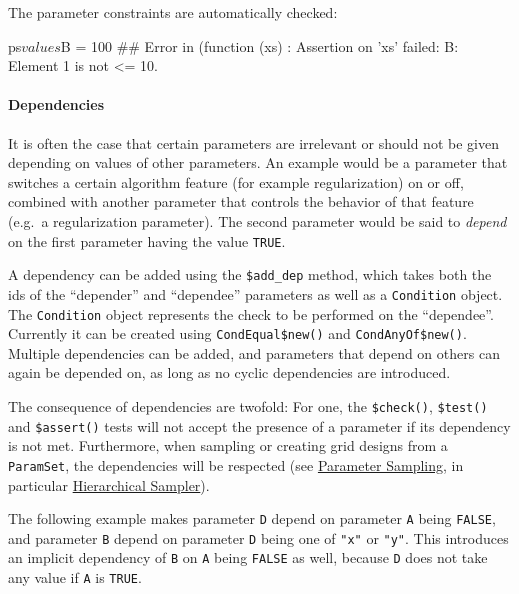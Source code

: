 \documentclass[12pt,]{scrbook}
\newenvironment{Shaded}{}{}
\newcommand{\DecValTok}[1]{#1}
\newcommand{\NormalTok}[1]{#1}
\newcommand{\OperatorTok}[1]{#1}
\newcommand{\StringTok}[1]{\textcolor[rgb]{0.00,0.50,0.50}{#1}}
\let\oldparagraph\paragraph
\renewcommand{\paragraph}[1]{\oldparagraph{#1}\mbox{}}
\begin{document}
The parameter constraints are automatically checked:

\begin{Shaded}
\begin{Highlighting}[]
\NormalTok{ps}\OperatorTok{$}\NormalTok{values}\OperatorTok{$}\NormalTok{B =}\StringTok{ }\DecValTok{100}
\NormalTok{## Error in (function (xs) : Assertion on 'xs' failed: B: Element 1 is not <= 10.}
\end{Highlighting}
\end{Shaded}

\hypertarget{dependencies}{%
\paragraph{Dependencies}\label{dependencies}}

It is often the case that certain parameters are irrelevant or should not be given depending on values of other parameters.
An example would be a parameter that switches a certain algorithm feature (for example regularization) on or off, combined with another parameter that controls the behavior of that feature (e.g.~a regularization parameter).
The second parameter would be said to \emph{depend} on the first parameter having the value \texttt{TRUE}.

A dependency can be added using the \texttt{\$add\_dep} method, which takes both the ids of the ``depender'' and ``dependee'' parameters as well as a \texttt{Condition} object.
The \texttt{Condition} object represents the check to be performed on the ``dependee''.
Currently it can be created using \texttt{CondEqual\$new()} and \texttt{CondAnyOf\$new()}.
Multiple dependencies can be added, and parameters that depend on others can again be depended on, as long as no cyclic dependencies are introduced.

The consequence of dependencies are twofold:
For one, the \texttt{\$check()}, \texttt{\$test()} and \texttt{\$assert()} tests will not accept the presence of a parameter if its dependency is not met.
Furthermore, when sampling or creating grid designs from a \texttt{ParamSet}, the dependencies will be respected (see \protect\hyperlink{parameter-sampling}{Parameter Sampling}, in particular \protect\hyperlink{hierarchical-sampler}{Hierarchical Sampler}).

The following example makes parameter \texttt{D} depend on parameter \texttt{A} being \texttt{FALSE}, and parameter \texttt{B} depend on parameter \texttt{D} being one of \texttt{"x"} or \texttt{"y"}.
This introduces an implicit dependency of \texttt{B} on \texttt{A} being \texttt{FALSE} as well, because \texttt{D} does not take any value if \texttt{A} is \texttt{TRUE}.
\end{document}
